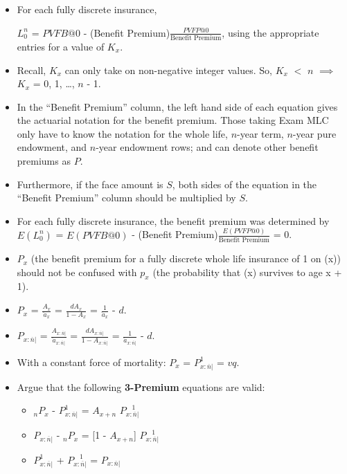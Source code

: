 \documentclass[]{book}
\begin{document}
\begin{itemize}
\item
  For each fully discrete insurance,

  \(L^n_0\) = \(PVFB@0\) - (Benefit
  Premium)\(\frac{PVFP@0}{\text{Benefit
  Premium}}\), using the appropriate entries for a value of \(K_x\).
\item
  Recall, \(K_x\) can only take on non-negative integer values. So,
  \(K_x\) \(<\) \(n\) \(\implies\) \(K_x\) = 0, 1, \ldots{}, \(n\) - 1.
\item
  In the ``Benefit Premium'' column, the left hand side of each equation
  gives the actuarial notation for the benefit premium. Those taking
  Exam MLC only have to know the notation for the whole life, \(n\)-year
  term, \(n\)-year pure endowment, and \(n\)-year endowment rows; and
  can denote other benefit premiums as \(P\).
\item
  Furthermore, if the face amount is \(S\), both sides of the equation
  in the ``Benefit Premium'' column should be multiplied by \(S\).
\item
  For each fully discrete insurance, the benefit premium was determined
  by \(E(L^n_0)\) = \(E(PVFB@0)\) - (Benefit
  Premium)\(\frac{E(PVFP@0)}{\text{Benefit Premium}}\) = 0.
\item
  \(P_x\) (the benefit premium for a fully discrete whole life insurance
  of 1 on (x)) should not be confused with \(p_x\) (the probability that
  (x) survives to age x + 1).
\item
  \(P_x\) = \(\frac{A_x}{\ddot{a}_x}\) = \(\frac{d A_x}{1 - A_x}\) =
  \(\frac{1}{\ddot{a}_x}\) - \(d\).
\item
  \(P_{x:\overline{n}|}\) =
  \(\frac{A_{x:\overline{n}|}}{\ddot{a}_{x:\overline{n}|}}\) =
  \(\frac{d A_{x:\overline{n}|}}{1 - A_{x:\overline{n}|}}\) =
  \(\frac{1}{\ddot{a}_{x:\overline{n}|}}\) - \(d\).
\item
  With a constant force of mortality: \(P_x\) =
  \({P}_{x:\overline{n}|}^{1}\) = \(v q\).
\item
  Argue that the following \textbf{3-Premium} equations are valid:

  \begin{itemize}
  \item
    \({}_{n}P_x\) - \({P}_{x:\overline{n}|}^{1}\) = \(A_{x + n}\)
    \({P}_{x:\overline{n}|}^{~~~~1}\)
  \item
    \(P_{x:\overline{n}|}\) - \({}_{n}P_x\) = {[}1 - \(A_{x + n}\){]}
    \({P}_{x:\overline{n}|}^{~~~~1}\)
  \item
    \({P}_{x:\overline{n}|}^{1}\) + \({P}_{x:\overline{n}|}^{~~~~1}\) =
    \(P_{x:\overline{n}|}\)
  \end{itemize}
\end{itemize}
\end{document}
